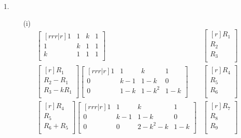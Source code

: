 \documentclass[12pt]{article}
\begin{document}
\begin{enumerate}
\begin{enumerate}
\begin{enumerate}
		\end{enumerate}	
		\medskip
	\item
	\medskip
		\begin{enumerate}
		\item [(i)]
		\begin{align*}
		\begin{bmatrix}[rrr|r]
		1 & 1 & k & 1\\
		1 & k & 1 & 1\\
		k & 1 & 1 & 1\\
		\end{bmatrix}&
		\begin{bmatrix}[r]
		R_1\\ R_2\\ R_3\\
		\end{bmatrix}\\
		\begin{bmatrix}[r]
		R_1\\
		R_2 - R_1\\
		R_3 - kR_1\\
		\end{bmatrix}
		\begin{bmatrix}[rrr|r]
		1 & 1 & k & 1\\
		0 & k-1 & 1-k & 0\\
		0 & 1-k & 1-k^2 & 1-k\\
		\end{bmatrix}&
		\begin{bmatrix}[r]
		R_{4}\\ R_{5}\\ R_{6}\\
		\end{bmatrix}\\
		\begin{bmatrix}[r]
		R_4\\
		R_5\\
		R_6 + R_5\\
		\end{bmatrix}
		\begin{bmatrix}[rrr|r]
		1 & 1 & k & 1\\
		0 & k-1 & 1-k & 0\\
		0 & 0 & 2 - k^2 - k & 1-k\\
		\end{bmatrix}&
		\begin{bmatrix}[r]
		R_{7}\\ R_{8}\\ R_{9}\\

\end{bmatrix}
\end{align*}
\end{enumerate}
\end{enumerate}
\end{enumerate}
\end{document}
